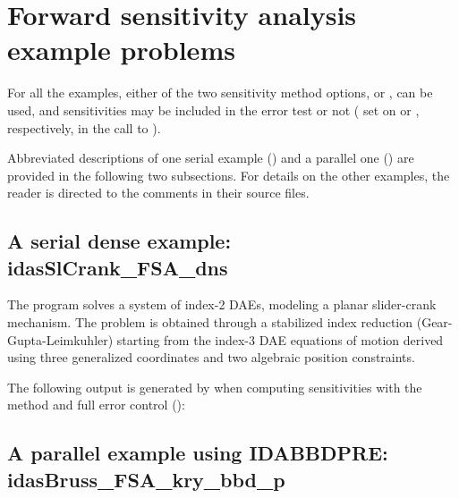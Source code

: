 \section{Forward sensitivity analysis example problems}\label{s:fwd_ex}

For all the {\idas} examples, either of the two sensitivity method options,
 or , can be used, 
and sensitivities may be included in the error test or not 
( set on  or , respectively, in the
call to ).

Abbreviated descriptions of one serial example ()
and a parallel one () are provided in the following
two subsections.  For details on the other examples, the reader is
directed to the comments in their source files.

\subsection{A serial dense example: idasSlCrank\_FSA\_dns}
\label{ss:idasSlCrank_FSA_dns}

The  program solves a system of index-2 DAEs, modeling a
planar slider-crank mechanism.  The problem is obtained through a stabilized index
reduction (Gear-Gupta-Leimkuhler) starting from the index-3 DAE equations of motion
derived using three generalized coordinates and two algebraic position constraints.

The following output is generated by  when computing
sensitivities with the  method and full error
control ():




\subsection{A parallel example using IDABBDPRE: idasBruss\_FSA\_kry\_bbd\_p}
\label{ss:idasBruss_FSA_kry_bbd_p}

